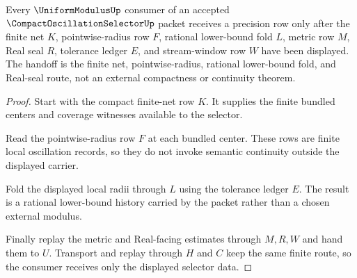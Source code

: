 \begin{theorem}
\label{thm:compact-oscillation-selector-finite-net-fold}
Every $\UniformModulusUp$ consumer of an accepted $\CompactOscillationSelectorUp$ packet receives a precision row only after the finite net $K$, pointwise-radius row $F$, rational lower-bound fold $L$, metric row $M$, Real seal $R$, tolerance ledger $E$, and stream-window row $W$ have been displayed. The handoff is the finite net, pointwise-radius, rational lower-bound fold, and Real-seal route, not an external compactness or continuity theorem.
\end{theorem}
\begin{proof}
Start with the compact finite-net row $K$. It supplies the finite bundled centers and coverage witnesses available to the selector.

Read the pointwise-radius row $F$ at each bundled center. These rows are finite local oscillation records, so they do not invoke semantic continuity outside the displayed carrier.

Fold the displayed local radii through $L$ using the tolerance ledger $E$. The result is a rational lower-bound history carried by the packet rather than a chosen external modulus.

Finally replay the metric and Real-facing estimates through $M,R,W$ and hand them to $U$. Transport and replay through $H$ and $C$ keep the same finite route, so the consumer receives only the displayed selector data.
\end{proof}

